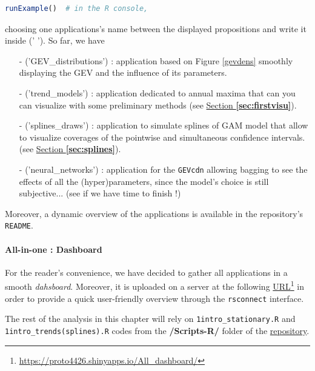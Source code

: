 \begin{center}
\begin{lstlisting}[language=R]
runExample()  # in the R console,
\end{lstlisting}
\end{center}
choosing one applications's name between the displayed propositions and write it inside (' ').
So far, we have
\begin{itemize}
	\item[-]('GEV\_distributions') :  application based on Figure \ref{gevdens} smoothly displaying the GEV and the influence of its parameters.
	
	\item[-] ('trend\_models') :
	application dedicated to annual maxima that can you can visualize with some preliminary methods (see \hyperref[sec:firstvisu]{Section \textbf{\ref{sec:firstvisu}}}).
	
	\item[-] ('splines\_draws') : application to simulate splines of GAM model that allow to visualize coverages of the pointwise and simultaneous confidence intervals. (see \hyperref[sec:splines]{Section \textbf{\ref{sec:splines}}}).

	\item[-] ('neural\_networks') : 
	application for the \texttt{GEVcdn} allowing bagging to see the effects of all the (hyper)parameters, since the model's choice is still subjective... (see if we have time to finish !)
	
\end{itemize}
Moreover, a dynamic overview of the applications is available in the repository's \texttt{README}.

\paragraph*{All-in-one : Dashboard} For the reader's convenience, we have decided to gather all applications in a smooth \emph{dahsboard}. Moreover, it is uploaded on a server at the following \href{https://proto4426.shinyapps.io/All\_dashboard/}{URL}\footnote{\url{https://proto4426.shinyapps.io/All\_dashboard/}}
 in order to provide a quick user-friendly overview through the \texttt{rsconnect} interface.
 
The rest of the analysis in this chapter will rely on \texttt{1intro\_stationary.R} and \\ \texttt{1intro\_trends(splines).R} codes from the \textbf{/Scripts-R/} folder of the \href{https://github.com/proto4426/PissoortThesis}{repository}.


